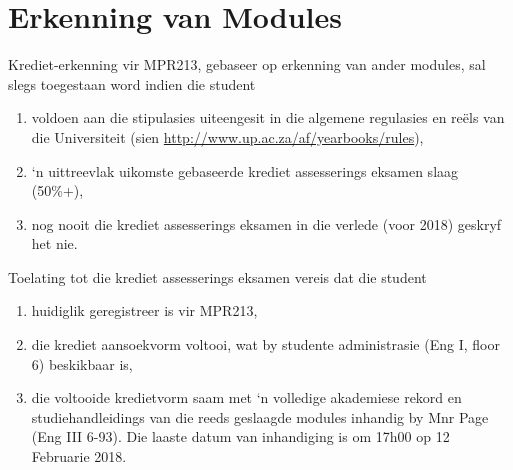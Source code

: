 \newpage
\section{Erkenning van Modules} \label{sec:credit_study_guide}
    \noindent
    Krediet-erkenning vir MPR213, gebaseer op erkenning van ander modules,
    sal slegs toegestaan word indien die student
    \begin{enumerate}
        \item voldoen aan die stipulasies uiteengesit in die algemene
            regulasies en re\"els van die Universiteit (sien
            \url{http://www.up.ac.za/af/yearbooks/rules}),
        \item `n uittreevlak uikomste gebaseerde krediet assesserings eksamen
            slaag (50\%+),
        \item nog nooit die krediet assesserings eksamen in die verlede (voor
            2018) geskryf het nie.
    \end{enumerate}

    \noindent
    Toelating tot die krediet assesserings eksamen vereis dat die student
    \begin{enumerate}
        \item huidiglik geregistreer is vir MPR213,
        \item die krediet aansoekvorm voltooi, wat by studente administrasie
            (Eng I, floor 6) beskikbaar is,
        \item die voltooide kredietvorm saam met `n volledige akademiese rekord
            en studiehandleidings van die reeds geslaagde modules inhandig by
            Mnr Page (Eng III 6-93). Die laaste datum van inhandiging is om
            17h00 op 12 Februarie 2018.
    \end{enumerate}

